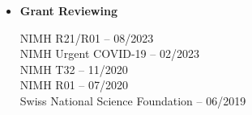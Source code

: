 \documentclass[letterpaper,10pt]{article}
\newlength{\outerbordwidth}
\newcommand{\resheading}[1]{\vspace{8pt}
  \parbox{\textwidth}{\setlength{\FrameSep}{\outerbordwidth}
    \begin{shaded}
\setlength{\fboxsep}{0pt}\framebox[\textwidth][l]{\setlength{\fboxsep}{4pt}\fcolorbox{shadecolorB}{shadecolorB}{\textbf{\sffamily{\mbox{~}\makebox[6.762in][l]{\large #1} \vphantom{p\^{E}}}}}}
    \end{shaded}
  }\vspace{-5pt}
}
\begin{document}
\begin{itemize}
\item {\textbf{\large{Grant Reviewing}}}

NIMH R21/R01 -- 08/2023\\
NIMH Urgent COVID-19 -- 02/2023\\
NIMH T32 -- 11/2020\\
NIMH R01 -- 07/2020\\
Swiss National Science Foundation -- 06/2019
	
	
	
	
	
	
\end{itemize}



%







%
%

%
\end{document}

